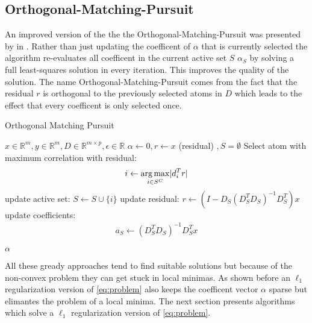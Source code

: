 \subsection{Orthogonal-Matching-Pursuit}
\label{sec:omp}

An improved version of the  the the Orthogonal-Matching-Pursuit  was presented by in \cite{Pati1993}.
Rather than just updating the coefficent of $\alpha$ that is currently selected  the algorithm re-evaluates all coefficent in the current active set $S$ 
 $\alpha_S$ by solving a full least-squares solution in every iteration. This improves the quality of the solution. \cite{OMP}
The name Orthogonal-Matching-Pursuit comes from the fact that the residual $r$ is orthogonal to the previously selected atoms in $D$ which leads to the effect that every coefficent is only selected once.



\begin{algorithm}
\caption{Orthogonal Matching Pursuit}
\label{alg:omp}
\begin{algorithmic}[1]
\REQUIRE $x \in \mathbb{R}^m, y \in \mathbb{R}^m, D \in \mathbb{R}^{m\times p}, \epsilon \in \mathbb{R}$
\STATE $\alpha \gets 0, r \gets x $ (residual) $, S=\emptyset$
\STATE Select atom with maximum correlation with residual: 
\begin{equation*}
i \gets \operatorname*{arg\,max}_{i \in S^C} \lvert d_i^Tr \rvert
\end{equation*}
\STATE update active set: $S \gets S \cup \{i\} $
\STATE update residual: $r \gets \left(I-D_S\left( D_S^T D_S \right)^{-1} D_S^T \right)x$
\STATE update coefficients: 
\begin{align}
a_S \gets \left( D_S^T D_S \right)^{-1} D_S^T x  \label{eq:omp_update}
\end{align}

\ENDFOR
\RETURN $\alpha$
\end{algorithmic}
\end{algorithm}


All these gready approaches tend to find suitable solutions but because of the non-convex problem they can get stuck in local minimas.
As shown before an $\ell_1$ regularization version of \ref{eq:problem} also keeps the coefficent vector $\alpha$ sparse but elimantes the problem of a local minima.
The next section presents algorithms which solve  a $\ell_1$ regularization version of \ref{eq:problem}.



